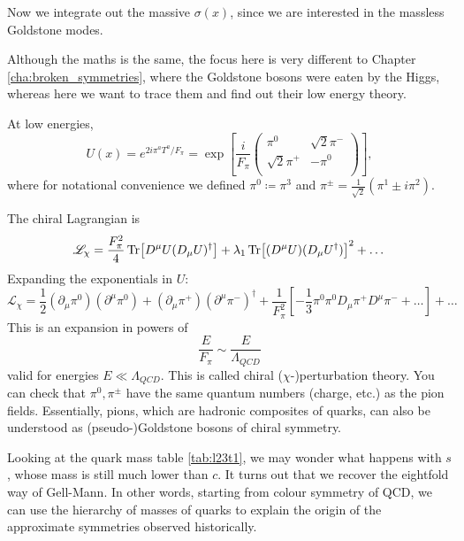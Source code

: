 Now we integrate out the massive $\sigma(x)$, since we are interested in the massless Goldstone modes.
\begin{remark}
  Although the maths is the same, the focus here is very different to Chapter \ref{cha:broken_symmetries}, where the Goldstone bosons were eaten by the Higgs, whereas here we want to trace them and find out their low energy theory.
\end{remark}
At low energies,
\begin{equation}
  U(x) = e^{2 i \pi^{a} T^{a} / F_\pi} = \exp[\frac{i}{F_\pi} 
  \begin{pmatrix}
   \pi^0 & \sqrt{2} \pi^- \\
   \sqrt{2} \pi^+ & -\pi^0 \\
  \end{pmatrix}
  ],
\end{equation}
where for notational convenience we defined $\pi^0 \coloneqq \pi^3$ and $\pi^{\pm} = \frac{1}{\sqrt{2}} (\pi^1 \pm i \pi^2)$.

The chiral Lagrangian is
\begin{equation}
  \mathscr{L}_{\chi} = \frac{F_\pi^2}{4} \Tr[D^{\mu} U (D_{\mu} U)^{\dagger}] + \lambda_1 \Tr[(D^{\mu} U) (D_{\mu} U^{\dagger})]^2 + \dots
\end{equation}
Expanding the exponentials in $U$:
\begin{equation}
  \mathscr{L}_{\chi} = \frac{1}{2} (\partial_{\mu} \pi^0) (\partial^{\mu} \pi^0) + (\partial_{\mu} \pi^+) (\partial^{\mu} \pi^-)^{\dagger} + \frac{1}{F_\pi^2} \left[ -\frac{1}{3} \pi^0 \pi^0 D_{\mu} \pi^+ D^{\mu} \pi^- + \dots \right] + \dots
\end{equation}
This is an expansion in powers of
\begin{equation}
  \frac{E}{F_\pi} \sim \frac{E}{\Lambda_{QCD}}
\end{equation}
valid for energies $E \ll \Lambda_{QCD}$.
This is called chiral ($\chi$-)perturbation theory.
You can check that $\pi^0, \pi^{\pm}$ have the same quantum numbers (charge, etc.) as the pion fields.
Essentially, pions, which are hadronic composites of quarks, can also be understood as (pseudo-)Goldstone bosons of chiral symmetry.

Looking at the quark mass table \ref{tab:l23t1}, we may wonder what happens with $s$, whose mass is still much lower than $c$.  It turns out that we recover the eightfold way of Gell-Mann. In other words, starting from colour symmetry of QCD, we can use the hierarchy of masses of quarks to explain the origin of the approximate symmetries observed historically.
